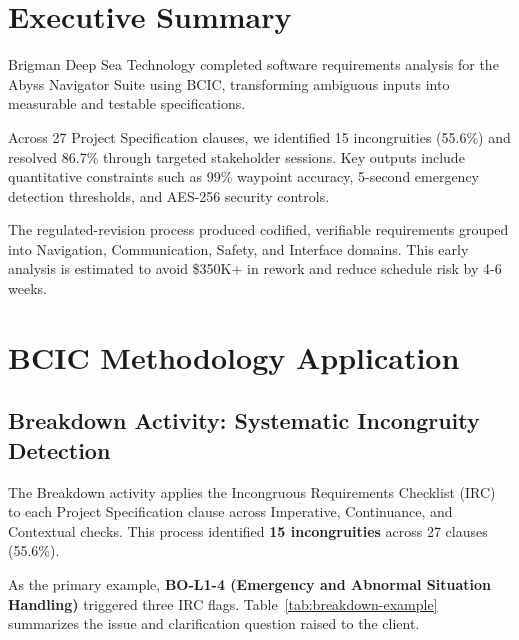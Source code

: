\documentclass[11pt,a4paper]{article}
\begin{document}
\newpage
\thispagestyle{empty}
\renewcommand{\contentsname}{Table of Contents}
\tableofcontents

\newpage
\setcounter{page}{3}
\section{Executive Summary}
\label{sec:executive}

Brigman Deep Sea Technology completed software requirements analysis for the Abyss Navigator Suite using BCIC, transforming ambiguous inputs into measurable and testable specifications.

Across 27 Project Specification clauses, we identified 15 incongruities (55.6\%) and resolved 86.7\% through targeted stakeholder sessions. Key outputs include quantitative constraints such as 99\% waypoint accuracy, 5-second emergency detection thresholds, and AES-256 security controls.

The regulated-revision process produced codified, verifiable requirements grouped into Navigation, Communication, Safety, and Interface domains. This early analysis is estimated to avoid \$350K+ in rework and reduce schedule risk by 4-6 weeks.


\section{BCIC Methodology Application}
\label{sec:bcic}

\subsection{Breakdown Activity: Systematic Incongruity Detection}

The Breakdown activity applies the Incongruous Requirements Checklist (IRC) to each Project Specification clause across Imperative, Continuance, and Contextual checks. This process identified \textbf{15 incongruities} across 27 clauses (55.6\%).

As the primary example, \textbf{BO-L1-4 (Emergency and Abnormal Situation Handling)} triggered three IRC flags. Table~\ref{tab:breakdown-example} summarizes the issue and clarification question raised to the client.
\end{document}
